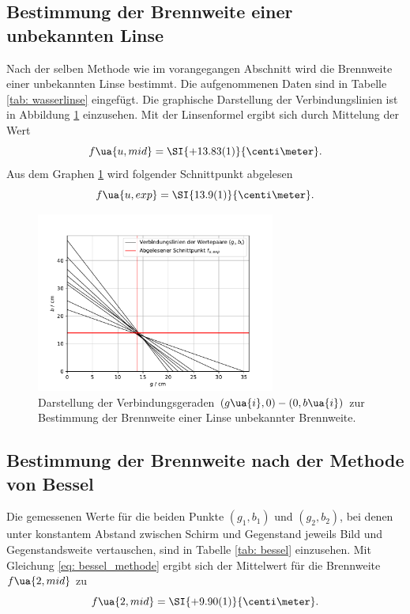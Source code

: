 \subsection{Bestimmung der Brennweite einer unbekannten Linse}
Nach der selben Methode wie im vorangegangen Abschnitt wird die Brennweite einer unbekannten Linse bestimmt.
Die aufgenommenen Daten sind in Tabelle \ref{tab: wasserlinse} eingefügt. Die graphische Darstellung der Verbindungslinien ist %
in Abbildung \ref{fig: wasserlinse} einzusehen. Mit der Linsenformel ergibt sich durch Mittelung der Wert
\begin{equation}
  f\ua{u, mid} = \SI{+13.83(1)}{\centi\meter}. %
\end{equation}
Aus dem Graphen \ref{fig: wasserlinse} wird folgender Schnittpunkt abgelesen
\begin{equation}
  f\ua{u, exp} = \SI{13.9(1)}{\centi\meter}.
\end{equation}

\begin{figure}
  \centering
  \includegraphics[width = 0.7\textwidth]{../Messdaten/plots/wasserlinse.pdf}
  \caption{Darstellung der Verbindungsgeraden $(g\ua{i}, 0) - (0, b\ua{i})$ zur Bestimmung der Brennweite einer
  Linse unbekannter Brennweite.}
  \label{fig: wasserlinse}
\end{figure}
\subsection{Bestimmung der Brennweite nach der Methode von Bessel}
Die gemessenen Werte für die beiden Punkte $(g_1, b_1)$ und $(g_2, b_2)$, bei denen unter konstantem Abstand
zwischen Schirm und Gegenstand jeweils Bild und Gegenstandsweite
vertauschen, sind in Tabelle \ref{tab: bessel} einzusehen. Mit Gleichung \eqref{eq: bessel_methode} ergibt sich der Mittelwert für
die Brennweite $f\ua{2, mid}$ zu
\begin{equation}
  f\ua{2, mid} = \SI{+9.90(1)}{\centi\meter}. %
  \label{eq: f_bessel}
\end{equation}

